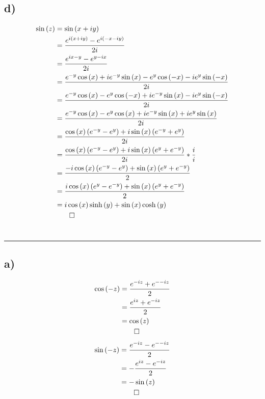 \documentclass[12pt]{article}
\begin{document}
\subsection{d)}
\begin{align*}
	\sin{(z)} &= \sin{(x+iy)}\\
	&= \frac{e^{i(x+iy)} - e^{i(-x-iy)}}{2i}\\
	&= \frac{e^{ix-y} - e^{y-ix}}{2i}\\
	&= \frac{e^{-y}\cos{(x)} + ie^{-y}\sin{(x)} - e^{y}\cos{(-x)} - ie^{y}\sin{(-x)}}{2i}\\
	&= \frac{e^{-y}\cos{(x)} - e^{y}\cos{(-x)} + ie^{-y}\sin{(x)} - ie^{y}\sin{(-x)}}{2i}\\
	&= \frac{e^{-y}\cos{(x)} - e^{y}\cos{(x)} + ie^{-y}\sin{(x)} + ie^{y}\sin{(x)}}{2i}\\
	&= \frac{\cos{(x)}\left(e^{-y} - e^{y}\right) + i\sin{(x)}\left(e^{-y} + e^{y}\right)}{2i}\\
	&= \frac{\cos{(x)}\left(e^{-y} - e^{y}\right) + i\sin{(x)}\left(e^{y} + e^{-y}\right)}{2i} * \frac{i}{i}\\
	&= \frac{-i\cos{(x)}\left(e^{-y} - e^{y}\right) + \sin{(x)}\left(e^{y} + e^{-y}\right)}{2}\\
	&= \frac{i\cos{(x)}\left(e^{y} - e^{-y}\right) + \sin{(x)}\left(e^{y} + e^{-y}\right)}{2}\\
	&= i\cos{(x)}\sinh{(y)} + \sin{(x)}\cosh{(y)}\\
	&\qed
\end{align*}
\newpage
\section{}\hrule
\subsection{a)}
\begin{align*}
	\cos{(-z)} &= \frac{e^{-iz} + e^{--iz}}{2}\\
	&= \frac{e^{iz} + e^{-iz}}{2}\\
	&= \cos{(z)}\\
	&\qed
\end{align*}
\begin{align*}
	\sin{(-z)} &= \frac{e^{-iz} - e^{--iz}}{2}\\
	&= -\frac{e^{iz} - e^{-iz}}{2}\\
	&= -\sin{(z)}\\
	&\qed
\end{align*}
\end{document}
